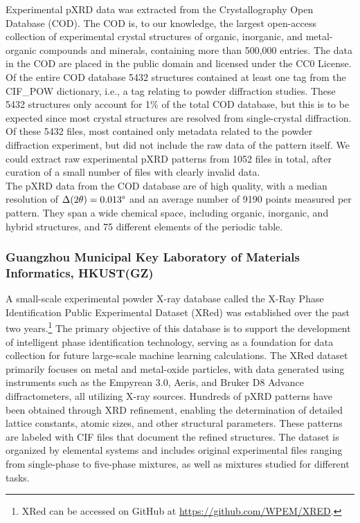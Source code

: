 Experimental pXRD data was extracted from the Crystallography Open Database (COD)\cite{Grazulis2009, Vaitkus2023}. The COD is, to our knowledge, the largest open-access collection of experimental crystal structures of organic, inorganic, and metal-organic compounds and minerals, containing more than 500,000 entries. The data in the COD are placed in the public domain and licensed under the CC0 License. Of the entire COD database 5432 structures contained at least one tag from the {CIF\_POW} dictionary, i.e., a tag relating to powder diffraction studies. These 5432 structures only account for 1\% of the total COD database, but this is to be expected since most crystal structures are resolved from single-crystal diffraction. Of these 5432 files, most contained only metadata related to the powder diffraction experiment, but did not include the raw data of the pattern itself. We could extract raw experimental pXRD patterns from 1052 files in total, after curation of a small number of files with clearly invalid data. \\

The pXRD data from the COD database are of high quality, with a median resolution of $\Delta(2\theta) = 0.013\degree$ and an average number of 9190 points measured per pattern. They span a wide chemical space, including organic, inorganic, and hybrid structures, and 75 different elements of the periodic table.

\subsubsection*{Guangzhou Municipal Key Laboratory of Materials Informatics, HKUST(GZ)}

A small-scale experimental powder X-ray database called the X-Ray Phase Identification Public Experimental Dataset (XRed) was established over the past two years.\footnote{XRed can be accessed on GitHub at \url{https://github.com/WPEM/XRED}.} The primary objective of this database is to support the development of intelligent phase identification technology, serving as a foundation for data collection for future large-scale machine learning calculations. The XRed dataset primarily focuses on metal and metal-oxide particles, with data generated using instruments such as the Empyrean 3.0, Aeris, and Bruker D8 Advance diffractometers, all utilizing  X-ray sources. Hundreds of pXRD patterns have been obtained through XRD refinement, enabling the determination of detailed lattice constants, atomic sizes, and other structural parameters. These patterns are labeled with CIF files that document the refined structures. The dataset is organized by elemental systems and includes original experimental files ranging from single-phase to five-phase mixtures, as well as mixtures studied for different tasks. \\

